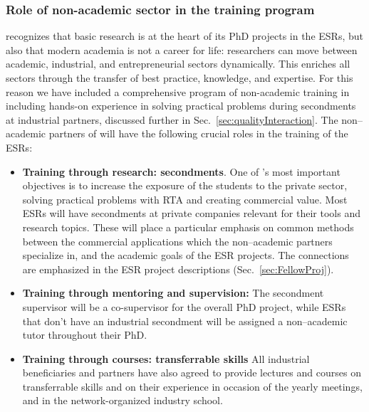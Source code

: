 	


\subsubsection{Role of non-academic sector in the training program}

\acronym recognizes that basic research is at the heart of its PhD projects in the ESRs, but also that modern academia is not a career for life: researchers can move between academic, industrial,
and entrepreneurial sectors dynamically. 
This enriches all sectors through the transfer of best practice, knowledge, and expertise.
For this reason we have included a comprehensive program of non-academic training in \acronym  including hands-on experience in solving practical problems during secondments
at industrial partners, discussed further in Sec.~\ref{sec:qualityInteraction}.
The non--academic partners of \acronym will have the following crucial roles in the training of the ESRs:
\begin{itemize}
\item \textbf{Training through research: secondments}. One of \acronym's most important objectives is to increase the exposure of the students to the private sector, solving practical problems with RTA and creating commercial value. 
Most ESRs will have secondments at private companies relevant for their tools and research topics.
These will place a particular emphasis on common methods between the commercial applications which the non--academic partners specialize in, and the academic goals of the ESR projects. 
The connections are emphasized in the ESR project descriptions (Sec.~\ref{sec:FellowProj}). 
\item \textbf{Training through mentoring and supervision:} The secondment supervisor will be a co-supervisor for the overall PhD project, while ESRs that don't have an industrial secondment will be assigned a non--academic tutor throughout their PhD.
\item \textbf{Training through courses: transferrable skills} All industrial beneficiaries and partners have also agreed to provide lectures and courses on transferrable skills and on their experience in occasion of the yearly meetings, and in the network-organized industry school. 
\end{itemize}

